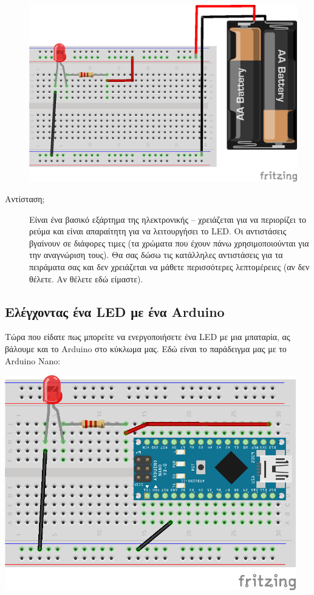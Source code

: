 \documentclass[a4paper,twoside,12pt]{article}
\begin{document}
\begin{description}
\begin{center}
  \includegraphics[width=0.95\textwidth]{images/main/led-battery}
\end{center}

\item[Αντίσταση;]
%
Είναι ένα βασικό εξάρτημα της ηλεκτρονικής -- χρειάζεται για να περιορίζει το ρεύμα και είναι απαραίτητη για να λειτουργήσει το LED. Οι αντιστάσεις βγαίνουν σε διάφορες τιμες (τα χρώματα που έχουν πάνω χρησιμοποιούνται για την αναγνώριση τους). Θα σας δώσω τις κατάλληλες αντιστάσεις για τα πειράματα σας και δεν χρειάζεται να μάθετε περισσότερες λεπτομέρειες (αν δεν θέλετε. Αν θέλετε εδώ είμαστε).
\end{description}

\subsection{Ελέγχοντας ένα LED με ένα Arduino}

Τώρα που είδατε πως μπορείτε να ενεργοποιήσετε ένα LED με μια μπαταρία, ας βάλουμε και το Arduino στο κύκλωμα μας. Εδώ είναι το παράδειγμα μας με το Arduino Nano:

\begin{center}
  \includegraphics[width=0.95\textwidth]{images/main/led-nano}
\end{center}
\end{document}
